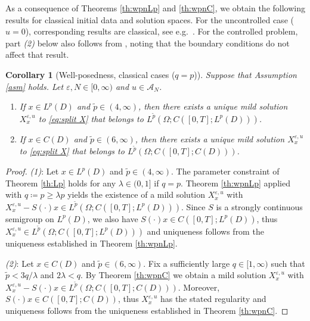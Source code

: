 \documentclass{amsart}
\theoremstyle{plain}
\theoremstyle{remark}
\theoremstyle{plain}
\newtheorem{corollary}[theorem]{Corollary}
\numberwithin{equation}{section}
\newcommand{\ceqq}{\coloneqq}
\newcommand{\eps}{\varepsilon}
\newcommand{\Om}{\Omega}
\newcommand{\A}{{\mathcal A}}
\begin{document}
As a consequence of Theorems \ref{th:wpnLp} and \ref{th:wpnC}, we obtain the following results for classical initial data and solution spaces.  For the uncontrolled case ($u=0$), corresponding results are classical, see e.g.\  \cite{daprato}. For the controlled problem,  part \textit{(2)} below   also follows from \cite[Th.\ 7.1]{Salins21reacdiff}, noting that the boundary conditions do not affect that result.  


 
\begin{corollary}[Well-posedness, classical cases ($q=p$)]\label{cor:wpn classical} 
Suppose that Assumption \ref{asm} holds. Let $\eps,N \in[ 0,\infty)$  and $u\in \A_N$.  
\begin{enumerate}
\item  If $x\in L^p(D)$ and $\tilde p\in(4,\infty)$, then there exists a unique mild solution $X_x^{\eps,u}$ to \eqref{eq:split X} that belongs to $L^{\tilde p}(\Om;C([0,T]; L^p(D)))$. 
\item If $x\in C(D)$ and $\tilde p\in(6,\infty)$, then there exists a unique mild solution $X_x^{\eps,u}$ to \eqref{eq:split X} that belongs to $L^{\tilde p}(\Om;C([0,T];C(D)))$. 
\end{enumerate}
\end{corollary}

\begin{proof}
\textit{(1)}: Let $x\in L^p(D)$ and $\tilde p\in(4,\infty)$. The parameter constraint of Theorem \ref{th:Lp} holds for any $\lambda\in(0,1]$ if $q=p$.  Theorem \ref{th:wpnLp} applied with $q\ceqq p\geq\lambda p$ yields the existence of a mild solution $X_x^{\eps,u}$  with $X_x^{\eps,u}-S(\cdot)x\in L^{\tilde p}(\Om;C([0,T]; L^p(D)))$. Since $S$ is a strongly continuous semigroup on $L^p(D)$, we also have $S(\cdot)x\in C([0,T];L^p(D))$, thus $X_x^{\eps,u} \in L^{\tilde p}(\Om;C([0,T]; L^p(D)))$ and uniqueness follows from the  uniqueness  established in Theorem \ref{th:wpnLp}. 

\textit{(2)}: Let $x\in C(D)$ and $\tilde p\in(6,\infty)$. Fix a sufficiently large $q\in[1,\infty)$ such that $\tilde p<3q/\lambda$ and $2\lambda<q$.  
By Theorem \ref{th:wpnC}  we obtain a mild solution $X_x^{\eps,u}$ with $X_x^{\eps,u}-S(\cdot)x\in L^{\tilde p}(\Om;C([0,T];C(D)))$. Moreover, $S(\cdot)x\in C([0,T];C(D))$, thus $X_x^{\eps,u}$ has the stated regularity and uniqueness follows from the uniqueness established in Theorem \ref{th:wpnC}. 
\end{proof} 
\end{document}
